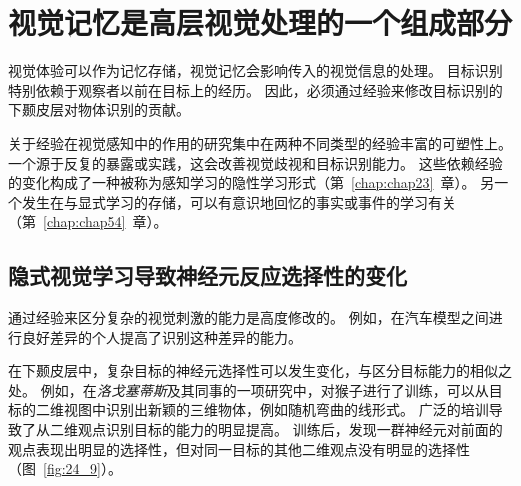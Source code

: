 \section{视觉记忆是高层视觉处理的一个组成部分}

视觉体验可以作为记忆存储，视觉记忆会影响传入的视觉信息的处理。
目标识别特别依赖于观察者以前在目标上的经历。
因此，必须通过经验来修改目标识别的下颞皮层对物体识别的贡献。


关于经验在视觉感知中的作用的研究集中在两种不同类型的经验丰富的可塑性上。
一个源于反复的暴露或实践，这会改善视觉歧视和目标识别能力。
这些依赖经验的变化构成了一种被称为感知学习的隐性学习形式（第~\ref{chap:chap23}~章）。
另一个发生在与显式学习的存储，可以有意识地回忆的事实或事件的学习有关（第~\ref{chap:chap54}~章）。



\subsection{隐式视觉学习导致神经元反应选择性的变化}

通过经验来区分复杂的视觉刺激的能力是高度修改的。
例如，在汽车模型之间进行良好差异的个人提高了识别这种差异的能力。


在下颞皮层中，复杂目标的神经元选择性可以发生变化，与区分目标能力的相似之处。
例如，在\textit{洛戈塞蒂斯}及其同事的一项研究中，对猴子进行了训练，可以从目标的二维视图中识别出新颖的三维物体，例如随机弯曲的线形式。
广泛的培训导致了从二维观点识别目标的能力的明显提高。
训练后，发现一群神经元对前面的观点表现出明显的选择性，但对同一目标的其他二维观点没有明显的选择性（图~\ref{fig:24_9}）。


